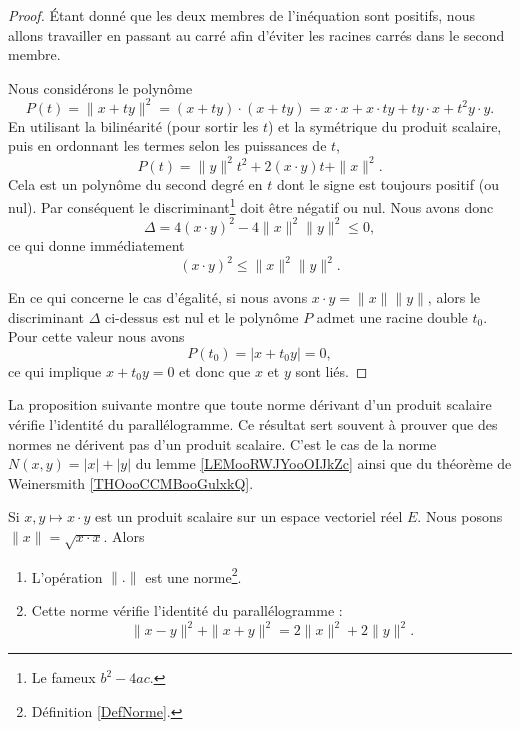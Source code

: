 \begin{proof}
	Étant donné que les deux membres de l'inéquation sont positifs, nous allons travailler en passant au carré afin d'éviter les racines carrés dans le second membre.

	Nous considérons le polynôme
	\begin{equation}
		P(t)=\| x+ty \|^2=(x+ty)\cdot(x+ty)=x\cdot x+x\cdot ty+ty\cdot x+t^2y\cdot y.
	\end{equation}
    En utilisant la bilinéarité (pour sortir les \( t\)) et la symétrique du produit scalaire, puis en ordonnant les termes selon les puissances de $t$,
	\begin{equation}
		P(t)=\| y \|^2t^2+2(x\cdot y)t+\| x \|^2.
	\end{equation}
	Cela est un polynôme du second degré en $t$ dont le signe est toujours positif (ou nul). Par conséquent le discriminant\footnote{Le fameux $b^2-4ac$.} doit être négatif ou nul. Nous avons donc
	\begin{equation}
		\Delta=4(x\cdot y)^2-4\| x \|^2\| y \|^2\leq 0,
	\end{equation}
	ce qui donne immédiatement
	\begin{equation}
		(x\cdot y)^2\leq\| x \|^2\| y \|^2.
	\end{equation}

    En ce qui concerne le cas d'égalité, si nous avons \( x\cdot y=\| x \|\| y \|\), alors le discriminant \( \Delta\) ci-dessus est nul et le polynôme \( P\) admet une racine double \( t_0\). Pour cette valeur nous avons
    \begin{equation}
        P(t_0)=| x+t_0y |=0,
    \end{equation}
    ce qui implique \( x+t_0y=0\) et donc que \( x\) et \( y\) sont liés.
\end{proof}

La proposition suivante montre que toute norme dérivant d'un produit scalaire vérifie l'identité du parallélogramme. Ce résultat sert souvent à prouver que des normes ne dérivent pas d'un produit scalaire. C'est le cas de la norme \( N(x,y)=| x |+| y |\) du lemme \ref{LEMooRWJYooOIJkZc} ainsi que du théorème de Weinersmith \ref{THOooCCMBooGulxkQ}.
\begin{proposition} \label{PropEQRooQXazLz}
    Si \( x,y\mapsto x\cdot y\) est un produit scalaire sur un espace vectoriel réel \( E\). Nous posons \( \| x \|=\sqrt{x\cdot x}\). Alors
    \begin{enumerate}
        \item
            L'opération \( \| . \|\) est une norme\footnote{Définition \ref{DefNorme}.}.
        \item
            Cette norme vérifie l'identité du parallélogramme :
            \begin{equation}        \label{EqYCLtWfJ}
                \| x-y \|^2+\| x+y \|^2=2\| x \|^2+2\| y \|^2.
            \end{equation}
    \end{enumerate}
\end{proposition}

